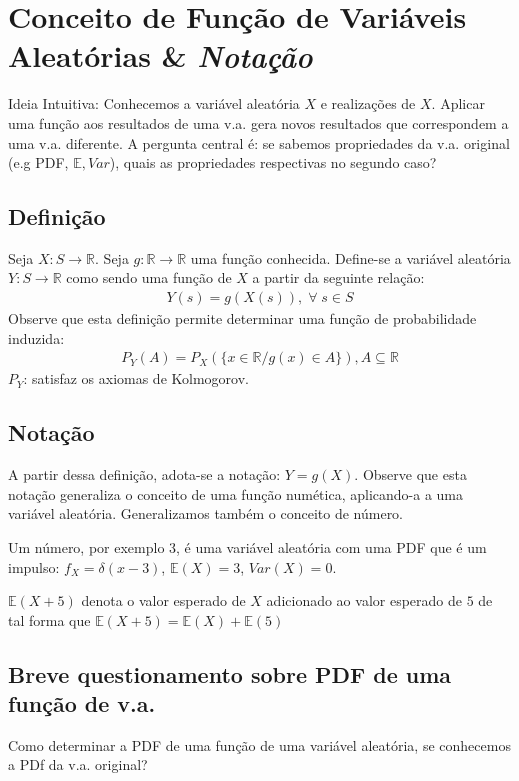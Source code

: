 \documentclass{article}
\renewcommand\it[1]{\textit{#1}}
\newcommand{\bb}[1]{\mathbb{#1}}
\begin{document}
\setlength{\abovedisplayskip}{12pt}
\setlength{\belowdisplayskip}{12pt}
\setlength{\abovedisplayshortskip}{0pt}
\setlength{\belowdisplayshortskip}{0pt}
\setlength{\jot}{2pt}

\section{Conceito de Função de Variáveis Aleatórias \& \it{Notação}}
Ideia Intuitiva: Conhecemos a variável aleatória $X$ e realizações de $X$. Aplicar uma função aos
resultados de uma v.a. gera novos resultados que correspondem a uma v.a. diferente. A pergunta
central é: se sabemos propriedades da v.a. original (e.g PDF, $\bb{E}, Var$), quais as propriedades
respectivas no segundo caso?

\subsection{Definição}
Seja $X: S \rightarrow \bb{R}$. Seja $g : \bb{R} \rightarrow \bb{R}$ uma função conhecida.
Define-se a variável aleatória $Y : S \rightarrow \bb{R}$ como sendo uma função de $X$ a partir da
seguinte relação:
\begin{align*}
    Y(s) = g(X(s)), \; \forall \; s \in S
\end{align*}
Observe que esta definição permite determinar uma função de probabilidade induzida:
\begin{align*}
    P_Y(A) = P_X(\{x \in \bb{R} / g(x) \in A\}), A \subseteq \bb{R}
\end{align*}
$P_Y$: satisfaz os axiomas de Kolmogorov.

\subsection{Notação}
A partir dessa definição, adota-se a notação: $Y = g(X)$. Observe que esta notação generaliza o
conceito de uma função numética, aplicando-a a uma variável aleatória. Generalizamos também o
conceito de número.

Um número, por exemplo 3, é uma variável aleatória com uma PDF que é um impulso: $f_X =
\delta(x-3)$, $\bb{E}(X) = 3$, $Var(X) = 0$.

$\bb{E}(X+5)$ denota o valor esperado de $X$ adicionado ao valor esperado de $5$ de tal forma que
$\bb{E}(X+5) = \bb{E}(X) + \bb{E}(5)$

\subsection{Breve questionamento sobre PDF de uma função de v.a.}
Como determinar a PDF de uma função de uma variável aleatória, se conhecemos a PDf da v.a.
original?
\end{document}
